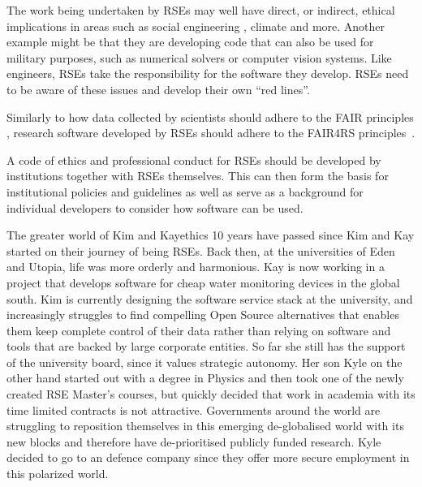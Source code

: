 \documentclass{eceasst}
\begin{document}
The work being undertaken by RSEs may well have direct, or indirect,
ethical implications in areas such as social engineering \cite{s2erc,siadati2024},
climate \cite{Lannelongue2023} and more.
Another example might be that they are developing code that can also be used for military purposes, such as numerical solvers or computer vision systems.
Like engineers, RSEs take the responsibility for the software they develop.
RSEs need to be aware of these issues and develop their own ``red lines''.

Similarly to how data collected by scientists should adhere to the FAIR principles \cite{FAIR}, research software developed by RSEs should adhere to the FAIR4RS principles~\cite{FAIR4RS}.

A code of ethics and professional conduct for RSEs should be developed by institutions together with RSEs themselves.
This can then form the basis for institutional policies and guidelines as well as serve as a background for individual developers to consider how software can be used.

\begin{story}{The greater world of Kim and Kay}{ethics}
10 years have passed since Kim and Kay started on their journey of being RSEs. Back then,
at the universities of Eden and Utopia, life was more orderly and harmonious. Kay is now working in a project that develops
software for cheap water monitoring devices in the global south. Kim is currently designing the software service stack
at the university, and increasingly struggles to find compelling Open Source alternatives that enables them keep complete control of their data
rather than relying on software and tools that are backed by large corporate entities. So far she still has the support of the university board, since it values
strategic autonomy.
Her son Kyle on the other hand started out with a degree in Physics and then took one of the newly created RSE Master's courses,
but quickly decided that work in academia with its time limited contracts is not attractive.
Governments around the world are struggling to reposition themselves in this emerging de-globalised world with its new blocks
and therefore have de-prioritised publicly funded research. Kyle decided to go to an defence company since they offer
more secure employment in this polarized world.
\end{story}
\end{document}
